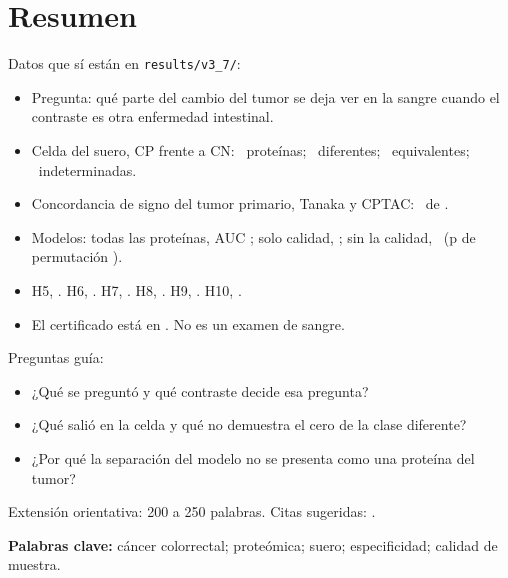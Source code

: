\chapter*{Resumen}

Datos que sí están en \texttt{results/v3\_7/}:
\begin{itemize}
\item Pregunta: qué parte del cambio del tumor se deja ver en la sangre cuando el contraste es otra enfermedad intestinal. \cite{rai2025,vasaikar2019,tanaka2024}
\item Celda del suero, CP frente a CN: \SueroN\ proteínas; \SueroDif\ diferentes; \SueroEq\ equivalentes; \SueroInd\ indeterminadas.
\item Concordancia de signo del tumor primario, Tanaka y CPTAC: \TejidoNum\ de \TejidoDen.
\item Modelos: todas las proteínas, AUC \MlTodas; solo calidad, \MlCalidad; sin la calidad, \MlSinCalidad\ (p de permutación \MlSinCalidadP).
\item H5, \HcincoEstado. H6, \HseisEstado. H7, \HsieteEstado. H8, \HochoEstado. H9, \HnueveEstado. H10, \HdiezEstado.
\item El certificado está en \CertificadoEstado. No es un examen de sangre. \cite{pepe2001}
\end{itemize}

Preguntas guía:
\begin{itemize}
\item ¿Qué se preguntó y qué contraste decide esa pregunta?
\item ¿Qué salió en la celda y qué no demuestra el cero de la clase diferente?
\item ¿Por qué la separación del modelo no se presenta como una proteína del tumor?
\end{itemize}

Extensión orientativa: 200 a 250 palabras. Citas sugeridas: \cite{vasaikar2019,tanaka2024,rai2025,lakens2017,pepe2001}.

\noindent\textbf{Palabras clave:} cáncer colorrectal; proteómica; suero; especificidad; calidad de muestra.
\clearpage
